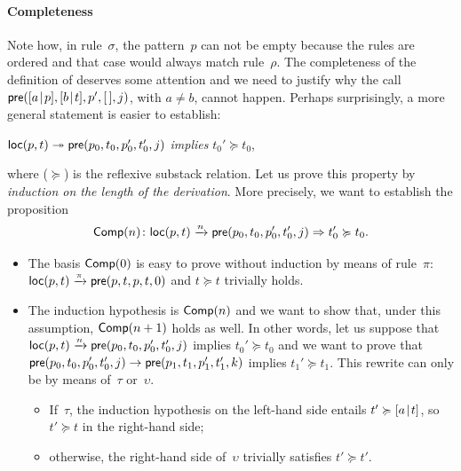 \paragraph{Completeness}

Note how, in rule~\(\sigma\), the pattern~\(p\) can not be empty
because the rules are ordered and that case would always match
rule~\(\rho\). The completeness of the definition of 
deserves some attention and we need to justify why the call
\(\textsf{pre}([{a}\!\mid\!{p}],[{b}\!\mid\!{t}],p',[\,],j)\), with \(a \neq b\),
cannot happen. Perhaps surprisingly, a more general statement is
easier to establish:
\begin{center}
\(\textsf{loc}(p,t) \twoheadrightarrow \textsf{pre}(p_0,t_0,p_0',t_0',j)\)
\textsl{implies} \(t_0' \succcurlyeq t_0\),
\end{center}
where (\(\succcurlyeq\)) is the reflexive substack relation. Let us
prove this property by \emph{induction on the length of the
  derivation}. More precisely, we want to establish the proposition
\begin{equation*}
\pred{Comp}{n} \colon \fun{loc}(p,t) \xrightarrow{\smash{n}}
\fun{pre}(p_0,t_0,p_0',t_0',j) \Rightarrow t_0' \succcurlyeq t_0.
\index{Comp@\predName{Comp}}
\end{equation*}
\begin{itemize}

  \item The basis \(\textsf{Comp}({0})\) is easy to prove without
    induction by means of rule~\(\pi\): \(\textsf{loc}(p,t)
    \xrightarrow{\smash{\pi}} \textsf{pre}(p,t,p,t,0)\) and \(t
    \succcurlyeq t\) trivially holds.

    \item The induction hypothesis is \(\textsf{Comp}({n})\) and we want
      to show that, under this assumption, \(\textsf{Comp}({n+1})\) holds
      as well. In other words, let us suppose that \(\textsf{loc}(p,t)
      \xrightarrow{\smash{n}} \textsf{pre}(p_0,t_0,p_0',t_0',j)\) implies
      \(t_0' \succcurlyeq t_0\) and we want to prove that
      \(\textsf{pre}(p_0,t_0,p_0',t_0',j) \rightarrow
      \textsf{pre}(p_1,t_1,p_1',t_1',k)\) implies \(t_1' \succcurlyeq
      t_1\). This rewrite can only be by means of~\(\tau\)
      or~\(\upsilon\).
      \begin{itemize}

      \item If~\(\tau\), the induction hypothesis on the
        left\hyp{}hand side entails \(t' \succcurlyeq [{a}\!\mid\!{t}]\),
        so \(t' \succcurlyeq t\) in the right\hyp{}hand side;

      \item otherwise, the right\hyp{}hand side of~\(\upsilon\)
        trivially satisfies \(t' \succcurlyeq t'\).

      \end{itemize}
\end{itemize}
